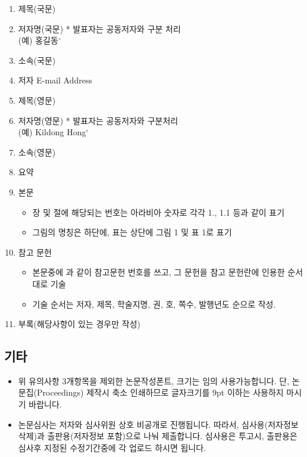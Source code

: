 \begin{enumerate}[itemsep=0pt,parsep=0pt]
	\renewcommand{\theenumi}{\arabic{enumi}}
	\renewcommand{\labelenumi}{\cl\theenumi}
	\item 제목(국문)
	\item 저자명(국문) * 발표자는 공동저자와 구분 처리 \\ (예) 홍길동$^{\circ}$
	\item 소속(국문)
	\item 저자 E-mail Address
	\item 제목(영문)
	\item 저자명(영문) * 발표자는 공동저자와 구분처리 \\ (예) Kildong Hong$^{\circ}$
	\item 소속(영문)
	\item 요약
	\item 본문
	\begin{itemize}[itemsep=0pt,parsep=0pt]
	  \item 장 및 절에 해당되는 번호는  아라비아 숫자로 각각 1., 1.1 등과 같이 표기
	  \item 그림의 명칭은 하단에, 표는 상단에 그림 1 및 표 1로 표기
	\end{itemize} 
	\item 참고 문헌
	\begin{itemize}[itemsep=0pt,parsep=0pt]
	  \item 본문중에 \cite{Lee:2008,Myung:2008,Lee:2010}과 같이 참고문헌 번호를 쓰고, 그 문헌을 참고 문헌란에 인용한 순서대로 기술
	  \item 기술 순서는 저자, 제목, 학술지명, 권, 호, 쪽수, 발행년도 순으로 작성.
	\end{itemize}
	\item 부록(해당사항이 있는 경우만 작성) 
\end{enumerate}



\subsection{기타}
\begin{itemize}[itemsep=0pt,parsep=0pt]
  \item 위 유의사항 3개항목을 제외한 논문작성폰트, 크기는 임의 사용가능합니다. 
  단, 논문집(Proceedings) 제작시 축소 인쇄하므로 글자크기를 9pt 이하는 사용하지 마시기 바랍니다.
  \item 논문심사는 저자와 심사위원 상호 비공개로 진행됩니다. 
  따라서, 심사용(저자정보 삭제)과 출판용(저자정보 포함)으로 나눠 제출합니다. 
  심사용은 투고시, 출판용은 심사후 지정된 수정기간중에 각 업로드 하시면 됩니다. 
\end{itemize}

